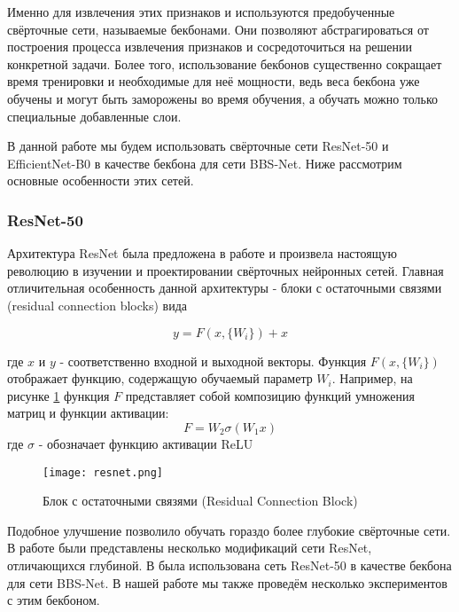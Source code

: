 Именно для извлечения этих признаков и используются предобученные свёрточные сети, называемые бекбонами. Они позволяют 
абстрагироваться от построения процесса извлечения признаков и сосредоточиться на решении конкретной задачи.
Более того, использование бекбонов существенно сокращает время тренировки и необходимые для неё мощности,
ведь веса бекбона уже обучены и могут быть заморожены во время обучения, а обучать можно только специальные добавленные слои.


В данной работе мы будем использовать свёрточные сети ResNet-50\cite{ResNet} и EfficientNet-B0\cite{Efficientnet} 
в качестве бекбона для сети BBS-Net\cite{BBS}. Ниже рассмотрим основные особенности этих сетей.

\subsubsection{ResNet-50}

Архитектура ResNet была предложена в работе \cite{ResNet} и произвела настоящую революцию 
в изучении и проектировании свёрточных нейронных сетей. Главная отличительная особенность данной архитектуры -
блоки с остаточными связями (residual connection blocks) вида

\begin{equation}
    y = F(x, \{W_i\}) + x 
\end{equation}

где $x$ и $y$ - соответственно входной и выходной векторы. Функция $F(x, \{W_i\})$ отображает 
функцию, содержащую обучаемый параметр $W_i$. Например, на рисунке \ref{fig:resnet} функция $F$ 
представляет собой композицию функций умножения матриц и функции активации:
\begin{equation}
    F = W_2 \sigma(W_1x)
\end{equation}
где $\sigma$ - обозначает функцию активации ReLU\cite{ReLU}

\begin{figure}[h!]
    \centering
    \texttt{[image: resnet.png]}
    \caption{Блок с остаточными связями (Residual Connection Block)}
    \label{fig:resnet}
\end{figure}

Подобное улучшение позволило обучать гораздо более глубокие свёрточные сети. 
В работе были представлены несколько модификаций сети ResNet, отличающихся глубиной.
В \cite{BBS} была использована сеть ResNet-50 в качестве бекбона для сети BBS-Net. В нашей работе 
мы также проведём несколько экспериментов с этим бекбоном.

